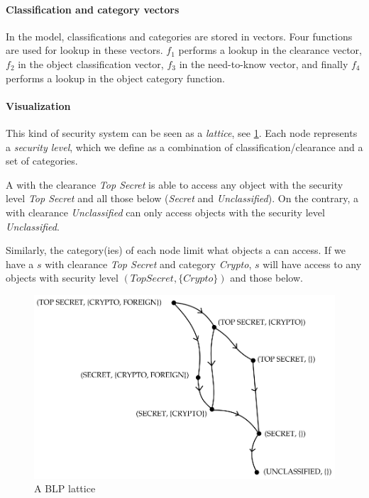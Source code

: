 \paragraph{Classification and category vectors}
 In the model, classifications and categories are stored in vectors.
 Four functions are used for lookup in these vectors.
 $f_1$ performs a lookup in the \ssubject{} clearance vector, $f_2$ in the object classification vector, $f_3$ in the \ssubject{} need-to-know vector, and finally $f_4$ performs a lookup in the object category function.

\paragraph{Visualization}
This kind of security system can be seen as a \textit{lattice}, see \cref{blp:lattice}.
Each node represents a \emph{security level}, which we define as a combination of classification/clearance and a set of categories.

A \ssubject{} with the clearance \emph{Top Secret} is able to access any object with the security level \emph{Top Secret} and all those below (\emph{Secret} and \emph{Unclassified}).
On the contrary, a \ssubject{} with clearance \emph{Unclassified} can only access objects with the security level \emph{Unclassified}.

Similarly, the category(ies) of each node limit what objects a \ssubject{} can access.
If we have a \ssubject{} $s$ with clearance \emph{Top Secret} and category \emph{Crypto}, $s$ will have access to any objects with security level $(Top Secret, \{Crypto\})$ and those below.

\begin{figure}
\centering
\includegraphics[width=\textwidth]{figures/blp_lattice}
\caption{A BLP lattice \cite{security_engineering_ross_anderson}}
\label{blp:lattice}
\end{figure}

